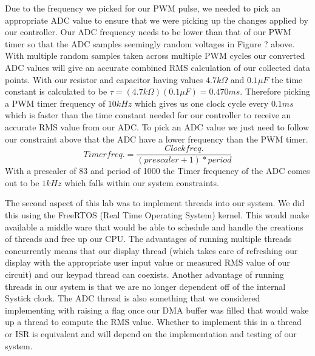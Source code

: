 Due to the frequency we picked for our PWM pulse, we needed to pick an appropriate ADC value to ensure that we were picking up the changes applied by our controller. Our ADC frequency needs to be lower than that of our PWM timer so that the ADC samples seemingly random voltages in Figure ? above. With multiple random samples taken across multiple PWM cycles our converted ADC values will give an accurate combined RMS calculation of our collected data points.
With our resistor and capacitor having values $4.7k\Omega$ and $0.1\mu F$ the time constant is calculated to be $\tau = (4.7k\Omega)(0.1\mu F) = 0.470 ms$.
Therefore picking a PWM timer frequency of $10kHz$ which gives us one clock cycle every $0.1 ms$ which is faster than the time constant needed for our controller to receive an accurate RMS value from our ADC.
To pick an ADC value we just need to follow our constraint above that the ADC have a lower frequency than the PWM timer.
\begin{equation}
 Timer freq. = \frac{Clock freq.}{(prescaler + 1) * period}
\end{equation}
With a prescaler of 83 and period of 1000 the Timer frequency of the ADC comes out to be $1kHz$ which falls within our system constraints.

The second aspect of this lab was to implement threads into our system. We did this using the FreeRTOS (Real Time Operating System) kernel. This would make available a middle ware that would be able to schedule and handle the creations of threads and free up our CPU. The advantages of running multiple threads concurrently means that our display thread (which takes care of refreshing our display with the appropriate user input value or measured RMS value of our circuit) and our keypad thread can coexists. Another advantage of running threads in our system is that we are no longer dependent off of the internal Systick clock. 
The ADC thread is also something that we considered implementing with raising a flag once our DMA buffer was filled that would wake up a thread to compute the RMS value. Whether to implement this in a thread or ISR is equivalent and will depend on the implementation and testing of our system.

 